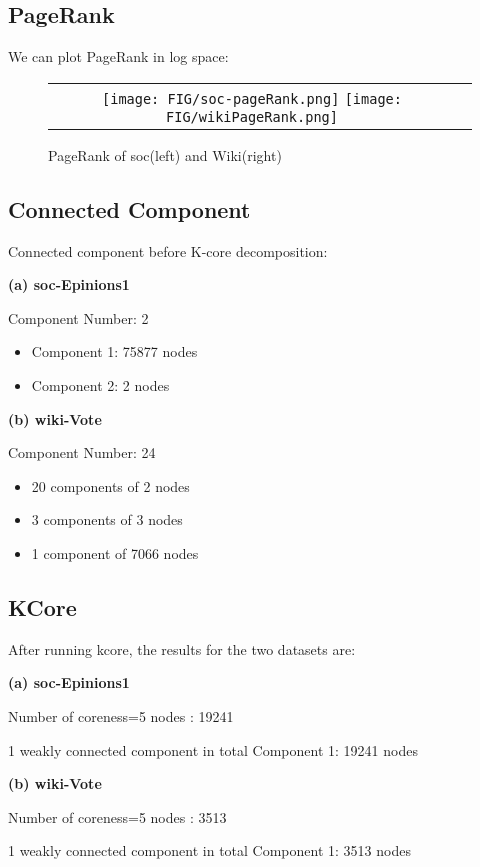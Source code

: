 \subsection{PageRank}

We can plot PageRank in log space:

\begin{figure}[H]
\begin{center}
\begin{tabular}{cc}
     \texttt{[image: FIG/soc-pageRank.png]} 
     \texttt{[image: FIG/wikiPageRank.png]} 
\end{tabular}
\caption{PageRank of soc(left) and Wiki(right)}
\label{fig:results}
\end{center}
\end{figure}

\subsection{Connected Component}

\par Connected component before K-core decomposition: \\
\par \textbf{(a) soc-Epinions1}
\par Component Number: 2
\begin{itemize}
\item Component 1: 75877 nodes
\item Component 2: 2 nodes
\end{itemize}

\par \textbf{(b) wiki-Vote}
\par Component Number: 24
\begin{itemize}
\item 20 components of 2 nodes
\item 3 components of 3 nodes
\item 1 component of 7066 nodes
\end{itemize}

\subsection{KCore}

\par After running kcore, the results for the two datasets are: \\
\par \textbf{(a) soc-Epinions1}
\par Number of coreness=5 nodes : 19241
\par 1 weakly connected component in total Component 1: 19241 nodes\\

\par \textbf{(b) wiki-Vote}
\par Number of coreness=5 nodes : 3513
\par 1 weakly connected component in total Component 1: 3513 nodes